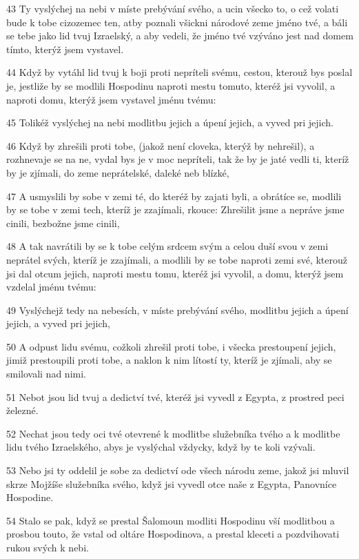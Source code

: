 \par 43 Ty vyslýchej na nebi v míste prebývání svého, a ucin všecko to, o cež volati bude k tobe cizozemec ten, atby poznali všickni národové zeme jméno tvé, a báli se tebe jako lid tvuj Izraelský, a aby vedeli, že jméno tvé vzýváno jest nad domem tímto, kterýž jsem vystavel.
\par 44 Když by vytáhl lid tvuj k boji proti nepríteli svému, cestou, kterouž bys poslal je, jestliže by se modlili Hospodinu naproti mestu tomuto, kteréž jsi vyvolil, a naproti domu, kterýž jsem vystavel jménu tvému:
\par 45 Tolikéž vyslýchej na nebi modlitbu jejich a úpení jejich, a vyved pri jejich.
\par 46 Když by zhrešili proti tobe, (jakož není cloveka, kterýž by nehrešil), a rozhnevaje se na ne, vydal bys je v moc nepríteli, tak že by je jaté vedli ti, kteríž by je zjímali, do zeme neprátelské, daleké neb blízké,
\par 47 A usmyslili by sobe v zemi té, do kteréž by zajati byli, a obrátíce se, modlili by se tobe v zemi tech, kteríž je zzajímali, rkouce: Zhrešilit jsme a nepráve jsme cinili, bezbožne jsme cinili,
\par 48 A tak navrátili by se k tobe celým srdcem svým a celou duší svou v zemi neprátel svých, kteríž je zzajímali, a modlili by se tobe naproti zemi své, kterouž jsi dal otcum jejich, naproti mestu tomu, kteréž jsi vyvolil, a domu, kterýž jsem vzdelal jménu tvému:
\par 49 Vyslýchejž tedy na nebesích, v míste prebývání svého, modlitbu jejich a úpení jejich, a vyved pri jejich,
\par 50 A odpust lidu svému, cožkoli zhrešil proti tobe, i všecka prestoupení jejich, jimiž prestoupili proti tobe, a naklon k nim lítostí ty, kteríž je zjímali, aby se smilovali nad nimi.
\par 51 Nebot jsou lid tvuj a dedictví tvé, kteréž jsi vyvedl z Egypta, z prostred peci železné.
\par 52 Nechat jsou tedy oci tvé otevrené k modlitbe služebníka tvého a k modlitbe lidu tvého Izraelského, abys je vyslýchal vždycky, když by te koli vzývali.
\par 53 Nebo jsi ty oddelil je sobe za dedictví ode všech národu zeme, jakož jsi mluvil skrze Mojžíše služebníka svého, když jsi vyvedl otce naše z Egypta, Panovníce Hospodine.
\par 54 Stalo se pak, když se prestal Šalomoun modliti Hospodinu vší modlitbou a prosbou touto, že vstal od oltáre Hospodinova, a prestal kleceti a pozdvihovati rukou svých k nebi.

